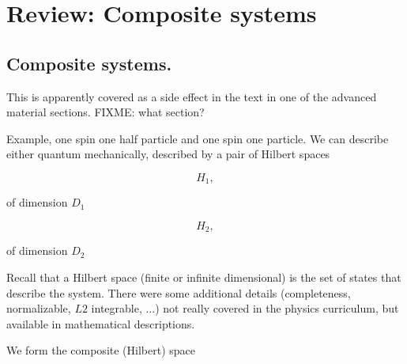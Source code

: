 %
%

\chapter{Review: Composite systems}
\label{chap:qmTwoL1}
{}
\date{Sept 12, 2011}

\beginArtWithToc

%

\section{Composite systems.}

This is apparently covered as a side effect in the text \cite{desai2009quantum} in one of the advanced material sections.  FIXME: what section?

Example, one spin one half particle and one spin one particle.  We can describe either quantum mechanically, described by a pair of Hilbert spaces

\begin{equation}\label{eqn:qmTwoL1:10}
H_1,
\end{equation}

of dimension $D_1$

\begin{equation}\label{eqn:qmTwoL1:30}
H_2,
\end{equation}

of dimension $D_2$

Recall that a Hilbert space (finite or infinite dimensional) is the set of states that describe the system.  There were some additional details (completeness, normalizable, $L2$ integrable, ...) not really covered in the physics curriculum, but available in mathematical descriptions.

We form the composite (Hilbert) space

